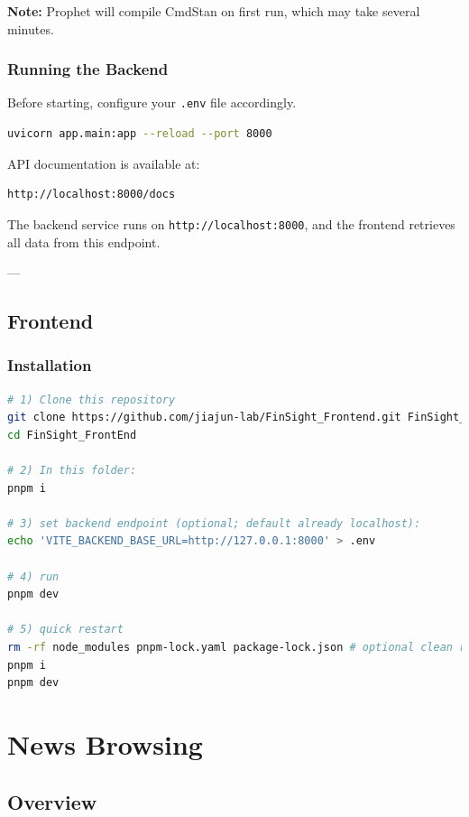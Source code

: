 \textbf{Note:} Prophet will compile CmdStan on first run, which may take several minutes.

\subsubsection{Running the Backend}

Before starting, configure your \texttt{.env} file accordingly.

\begin{lstlisting}[language=bash]
uvicorn app.main:app --reload --port 8000
\end{lstlisting}

API documentation is available at:

\begin{lstlisting}
http://localhost:8000/docs
\end{lstlisting}

The backend service runs on \texttt{http://localhost:8000}, and the frontend retrieves all data from this endpoint.

---

\subsection{Frontend}
\subsubsection{Installation}

\begin{lstlisting}[language=bash]
# 1) Clone this repository
git clone https://github.com/jiajun-lab/FinSight_Frontend.git FinSight_FrontEnd
cd FinSight_FrontEnd

# 2) In this folder:
pnpm i

# 3) set backend endpoint (optional; default already localhost):
echo 'VITE_BACKEND_BASE_URL=http://127.0.0.1:8000' > .env

# 4) run
pnpm dev

# 5) quick restart
rm -rf node_modules pnpm-lock.yaml package-lock.json # optional clean reboot
pnpm i 
pnpm dev 
\end{lstlisting}



\section{News Browsing}

\subsection{Overview}

